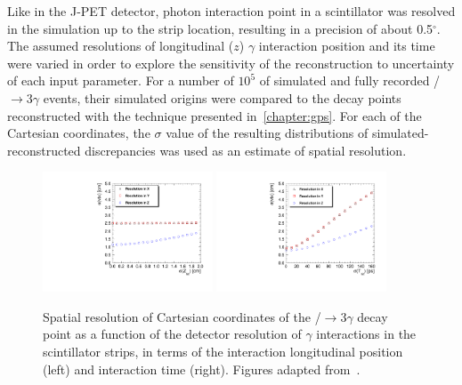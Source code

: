 Like in the J-PET detector, photon interaction point in a scintillator was resolved in the simulation up to the strip location, resulting in a precision of about 0.5$^{\circ}$. The assumed resolutions of longitudinal ($z$) $\gamma$ interaction position and its time were varied in order to explore the sensitivity of the reconstruction to uncertainty of each input parameter. For a number of $10^{5}$ of simulated and fully recorded \ops/$\to 3\gamma$ events, their simulated origins were compared to the decay points reconstructed with the technique presented in~\cref{chapter:gps}. For each of the Cartesian coordinates, the $\sigma$ value of the resulting distributions of simulated-reconstructed discrepancies was used as an estimate of spatial resolution.

\begin{figure}[h!]
  \centering
  \includegraphics[width=0.45\textwidth]{Chapter8_analysis_jpet/img/res_vs_z}
  \hspace{1em}
  \includegraphics[width=0.45\textwidth]{Chapter8_analysis_jpet/img/res_vs_t}
  \caption{Spatial resolution of Cartesian coordinates of the \ops/$\to 3\gamma$ decay point as a function of the detector resolution of $\gamma$ interactions in the scintillator strips, in terms of the interaction longitudinal position (left) and interaction time (right). Figures adapted from~\cite{gajos_gps}.}\label{fig:jpet_mc_res}
\end{figure}

